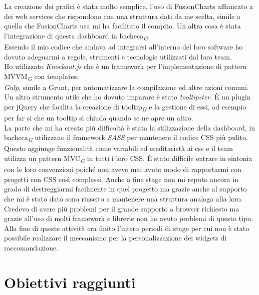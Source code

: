 \documentclass[a4paper, 12pt, twoside, openright]{book}
\newcommand{\gloss}[1]{#1\textsubscript{\textit{\tiny{G}}}}
\begin{document}
La creazione dei grafici è stata molto semplice, l'uso di FusionCharts affiancato a dei web services che rispondono con una struttura dati da me scelta, simile a quella che FusionCharts usa mi ha facilitato il compito. Un altra cosa è stata l'integrazione di questa dashboard in \gloss{bacheca}.\\
Essendo il mio codice che andava ad integrarsi all'interno del loro software ho dovuto adeguarmi a regole, strumenti e tecnologie utilizzati dal loro team.\\
Ho utilizzato \textit{Knockout.js} che è un framework per l'implementazione di pattern \gloss{MVVM} con templates.\\
\textit{Gulp}, simile a Grunt, per automatizzare la compilazione ed altre azioni comuni.\\
Un altro strumento utile che ho dovuto imparare è stato \textit{tooltipster}. \`{E} un plugin per jQuery che facilita la creazione di \gloss{tooltip} e la gestione di essi, ad esempio per far si che un tooltip si chiuda quando se ne apre un altro.\\
La parte che mi ha creato più difficoltà è stata la stilizzazione della dashboard, in \gloss{bacheca} utilizzano il framework \textit{SASS} per mantenere il codice CSS più pulito. Questo aggiunge funzionalità come variabili ed ereditarietà ai css e il team utilizza un pattern \gloss{MVC} in tutti i loro CSS. \`{E} stato difficile entrare in sintonia con le loro convenzioni poiché non avevo mai avuto modo di rapportarmi con progetti con CSS così complessi. Anche a fine stage non mi reputo ancora in grado di destreggiarmi facilmente in quel progetto ma grazie anche al supporto che mi è stato dato sono riuscito a mantenere una struttura analoga alla loro.\\
Credevo di avere più problemi per il grande supporto a browser richiesto ma grazie all'uso di molti framework e librerie non ho avuto problemi di questo tipo.\\
Alla fine di queste attività era finito l'intero periodi di stage per cui non è stato possibile realizzare il meccanismo per la personalizzazione dei widgets di raccomandazione.

\section{Obiettivi raggiunti}
\end{document}
